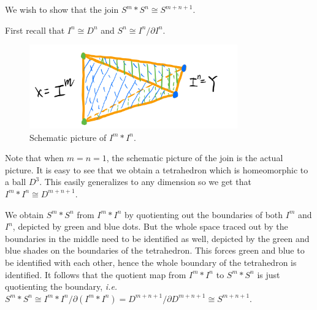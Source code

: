 \documentclass[12pt]{article}
\begin{document}
\begin{problem}[2]
We wish to show that the join $ S^{m} * S^{n} \cong S^{m+n+1}$.

First recall that $ I^{n} \cong D^{n}$ and $ S^{n} \cong I^{n} / \partial I^{n}$.
~\begin{figure}[H]
	\centering
	\includegraphics[width=0.8\textwidth]{./figures/join.png}
	\caption{Schematic picture of $ I^{m}*I^{n}$.}
\end{figure}
Note that when $ m=n=1$, the schematic picture of the join is the actual picture. It is easy to see that we obtain a tetrahedron which is homeomorphic to a ball $ D^3$. This easily generalizes to any dimension so we get that $ I^{m} * I^{n} \cong D^{m+n+1}$.

We obtain $ S^{m} * S^{n}$ from $ I^{m} * I^{n}$ by quotienting out the boundaries of both $ I^{m}$ and $ I^{n}$, depicted by green and blue dots. But the whole space traced out by the boundaries in the middle need to be identified as well, depicted by the green and blue shades on the boundaries of the tetrahedron. This forces green and blue to be identified with each other, hence the whole boundary of the tetrahedron is identified. It follows that the quotient map from $ I^{m} * I^{n}$ to $ S^{m} * S^{n}$ is just quotienting the boundary, \emph{i.e.} $ S^{m} * S^{n} \cong I^{m}*I^{n} / \partial (I^{m}*I^{n}) = D^{m+n+1} / \partial D^{m+n+1} \cong S^{m+n+1}$.


\end{problem}
\end{document}
